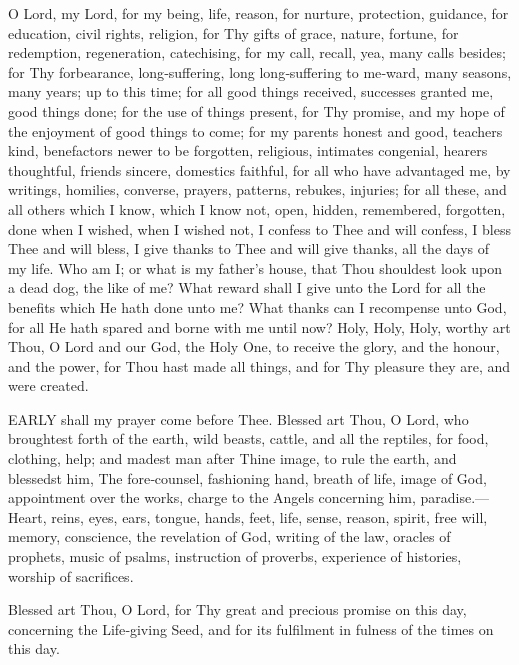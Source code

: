 O Lord, my Lord, for my being, life, reason, for nurture, protection, guidance, for education, civil rights, religion, for Thy gifts of grace, nature, fortune, for redemption, regeneration, catechising, for my call, recall, yea, many calls besides; for Thy forbearance, long‑suffering, long long‑suffering to me‑ward, many seasons, many years; up to this time; for all good things received, successes granted me, good things done; for the use of things present, for Thy promise, and my hope of the enjoyment of good things to come; for my parents honest and good, teachers kind, benefactors newer to be forgotten, religious, intimates congenial, hearers thoughtful, friends sincere, domestics faithful, for all who have advantaged me, by writings, homilies, converse, prayers, patterns, rebukes, injuries; for all these, and all others which I know, which I know not, open, hidden, remembered, forgotten, done when I wished, when I wished not, I confess to Thee and will confess, I bless Thee and will bless, I give thanks to Thee and will give thanks, all the days of my life. Who am I; or what is my father’s house, that Thou shouldest look upon a dead dog, the like of me? What reward shall I give unto the Lord for all the benefits which He hath done unto me? What thanks can I recompense unto God, for all He hath spared and borne with me until now? Holy, Holy, Holy, worthy art Thou, O Lord and our God, the Holy One, to receive the glory, and the honour, and the power, for Thou hast made all things, and for Thy pleasure they are, and were created.



EARLY shall my prayer come before Thee. Blessed art Thou, O Lord, who broughtest forth of the earth, wild beasts, cattle, and all the reptiles, for food, clothing, help; and madest man after Thine image, to rule the earth, and blessedst him, The fore‑counsel, fashioning hand, breath of life, image of God, appointment over the works, charge to the Angels concerning him, paradise.— Heart, reins, eyes, ears, tongue, hands, feet, life, sense, reason, spirit, free will, memory, conscience, the revelation of God, writing of the law, oracles of prophets, music of psalms, instruction of proverbs, experience of histories, worship of sacrifices.

Blessed art Thou, O Lord, for Thy great and precious promise on this day, concerning the Life‑giving Seed, and for its fulfilment in fulness of the times on this day.

